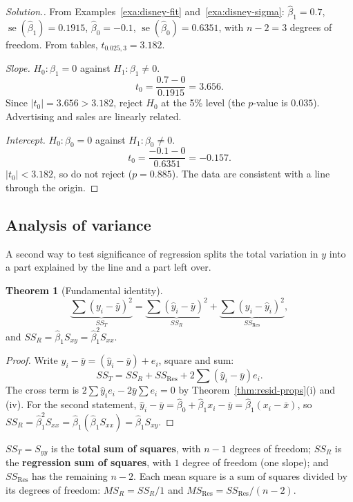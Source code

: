 \documentclass[11pt,a4paper]{article}
\numberwithin{equation}{section}
\theoremstyle{definition}
\newtheorem{thm}{Theorem}[subsection]
\newenvironment{solution}
  {\renewcommand{\qedsymbol}{}\begin{proof}[\textit{Solution}.]}
  {\end{proof}}
\begin{document}
\begin{solution}
From Examples~\ref{exa:disney-fit} and~\ref{exa:disney-sigma}: $\hat\beta_1 = 0.7$,
$\operatorname{se}(\hat\beta_1) = 0.1915$, $\hat\beta_0 = -0.1$,
$\operatorname{se}(\hat\beta_0) = 0.6351$, with $n - 2 = 3$ degrees of freedom.
From tables, $t_{0.025,3} = 3.182$.

\emph{Slope.} $H_0\colon \beta_1 = 0$ against $H_1\colon \beta_1 \neq 0$.
\[
t_0 = \frac{0.7 - 0}{0.1915} = 3.656 .
\]
Since $|t_0| = 3.656 > 3.182$, reject $H_0$ at the 5\% level (the $p$-value is $0.035$).
Advertising and sales are linearly related.

\emph{Intercept.} $H_0\colon \beta_0 = 0$ against $H_1\colon \beta_0 \neq 0$.
\[
t_0 = \frac{-0.1 - 0}{0.6351} = -0.157 .
\]
$|t_0| < 3.182$, so do not reject ($p = 0.885$). The data are consistent with a line through
the origin.
\end{solution}

\subsection{Analysis of variance}\label{ssec:anova}
A second way to test significance of regression splits the total variation in $y$ into a
part explained by the line and a part left over.

\begin{thm}[Fundamental identity]\label{thm:anova}
\[
\underbrace{\sum (y_i - \bar y)^2}_{SS_T}
= \underbrace{\sum (\hat y_i - \bar y)^2}_{SS_R}
+ \underbrace{\sum (y_i - \hat y_i)^2}_{SS_{\mathrm{Res}}} ,
\]
and $SS_R = \hat\beta_1 S_{xy} = \hat\beta_1^2 S_{xx}$.
\end{thm}

\begin{proof}
Write $y_i - \bar y = (\hat y_i - \bar y) + e_i$, square and sum:
\[
SS_T = SS_R + SS_{\mathrm{Res}} + 2\sum (\hat y_i - \bar y) e_i .
\]
The cross term is $2\sum \hat y_i e_i - 2\bar y \sum e_i = 0$ by
Theorem~\ref{thm:resid-props}(i) and (iv). For the second statement,
$\hat y_i - \bar y = \hat\beta_0 + \hat\beta_1 x_i - \bar y = \hat\beta_1 (x_i - \bar x)$,
so $SS_R = \hat\beta_1^2 S_{xx} = \hat\beta_1 (\hat\beta_1 S_{xx}) = \hat\beta_1 S_{xy}$.
\end{proof}

$SS_T = S_{yy}$ is the \textbf{total sum of squares}, with $n-1$ degrees of freedom;
$SS_R$ is the \textbf{regression sum of squares}, with $1$ degree of freedom (one slope); and
$SS_{\mathrm{Res}}$ has the remaining $n - 2$. Each mean square is a sum of squares divided by
its degrees of freedom: $MS_R = SS_R/1$ and $MS_{\mathrm{Res}} = SS_{\mathrm{Res}}/(n-2)$.
\end{document}
